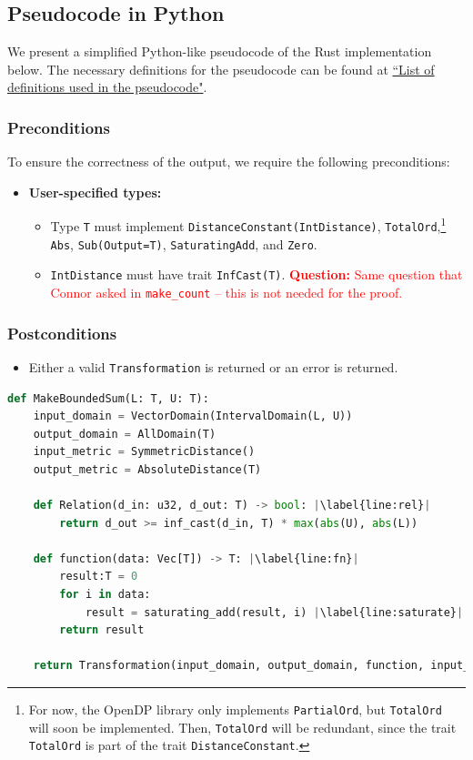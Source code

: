\documentclass[11pt,a4paper]{article}
\theoremstyle{definition}
\newcommand{\questionc}[1]{\textcolor{red}{\textbf{Question:} #1}}
\begin{document}
\subsection{Pseudocode in Python}
We present a simplified Python-like pseudocode of the Rust implementation below. The necessary definitions for the pseudocode can be found at \href{https://www.overleaf.com/project/60d215bf90b337ac02200a99}{``List of definitions used in the pseudocode"}.

\subsubsection*{Preconditions}
To ensure the correctness of the output, we require the following preconditions:

\begin{itemize}
    \item \textbf{User-specified types:}
    \begin{itemize}
        \item Type \texttt{T} must implement \texttt{DistanceConstant(IntDistance)}, \texttt{TotalOrd},\footnote{For now, the OpenDP library only implements \texttt{PartialOrd}, but \texttt{TotalOrd} will soon be implemented. Then, \texttt{TotalOrd} will be redundant, since the trait \texttt{TotalOrd} is part of the trait \texttt{DistanceConstant}.} \texttt{Abs}, \texttt{Sub(Output=T)}, \texttt{SaturatingAdd}, and \texttt{Zero}.
        \item \texttt{IntDistance} must have trait \texttt{InfCast(T)}. \questionc{Same question that Connor asked in \texttt{make\_count} -- this is not needed for the proof.}
\end{itemize}
\end{itemize}

\subsubsection*{Postconditions}
\begin{itemize}
    \item Either a valid \texttt{Transformation} is returned or an error is returned.
\end{itemize}

\begin{lstlisting}[language=Python, escapechar=|]
def MakeBoundedSum(L: T, U: T):
    input_domain = VectorDomain(IntervalDomain(L, U))
    output_domain = AllDomain(T)
    input_metric = SymmetricDistance()
    output_metric = AbsoluteDistance(T)
    
    def Relation(d_in: u32, d_out: T) -> bool: |\label{line:rel}|
        return d_out >= inf_cast(d_in, T) * max(abs(U), abs(L))
    
    def function(data: Vec[T]) -> T: |\label{line:fn}|
        result:T = 0
        for i in data:
            result = saturating_add(result, i) |\label{line:saturate}|
        return result
        
    return Transformation(input_domain, output_domain, function, input_metric, output_metric, stability_relation = Relation)
\end{lstlisting}
\end{document}
